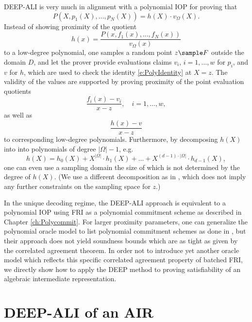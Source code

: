\documentclass[11pt,article,oneside]{memoir}
\theoremstyle{definition}
\theoremstyle{remark}
\begin{document}
DEEP-ALI is very much in alignment with a polynomial IOP for proving that
\begin{equation}
\label{e:PolyIdentity}
P(X,p_1(X),..., p_N(X)) = h(X)\cdot v_\Omega(X). 
\end{equation}
Instead of showing proximity of the quotient
\[
h(x) = \frac{P(x,f_1(x),..., f_N(x))}{v_\Omega(x)}
\]
to a low-degree polynomial, one samples a random point $z\sample F$ outside the domain $D$, and let the prover provide evaluations claims $v_i$, $i=1,\ldots,w$ for $p_i$, and $v$ for $h$, which are used to check the identity \eqref{e:PolyIdentity} at $X=z$.
The validity of the values are supported by proving proximity of the point evaluation quotients
\[
\frac{f_i(x)-v_i}{x-z}, \quad i=1,\ldots ,w,
\]
as well as
\[
\frac{h(x)-v}{x-z}
\]
to corresponding low-degree polynomials.
Furthermore, by decomposing $h(X)$ into into polynomials of degree $|\Omega|-1$, e.g.
\begin{equation}
\label{e:Splitting}
h(X)=h_0(X)+X^{|\Omega|}\cdot h_1(X)+ \ldots +X^{(d-1)\cdot |\Omega|}\cdot  h_{d-1}(X),
\end{equation}
one can even use a sampling domain the size of which is not determined by the degree of $h(X)$. 
(We use a different decomposition as in \cite{DEEPFRI, ethSTARK}, which does not imply any further constraints on the sampling space for $z$.)

In the unique decoding regime, the DEEP-ALI approach is equivalent to a polynomial IOP using FRI as a polynomial commitment scheme as described in Chapter \ref{ch:Polycommit}. 
For larger proximity parameters, one can generalize the polynomial oracle model to list polynomial commitment schemes as done in \cite{Redshift}, but their approach does not yield soundness bounds which are as tight as given by the correlated agreement theorem. 
In order not to introduce yet another oracle model which reflects this specific correlated agreement property of batched FRI, we directly show how to apply the DEEP method to proving satisfiability of an algebraic intermediate representation.


\section{DEEP-ALI of an AIR}
\end{document}
